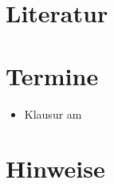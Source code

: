 \documentclass[11pt]{exam}
\begin{document}


\section{Literatur} %
\label{sec:literatur}



\section{Termine} %
\label{sec:termine}

\begin{itemize}
  \item Klausur am
\end{itemize}



\section{Hinweise} %
\label{sec:hinweise}



\clearpage

\end{document}
